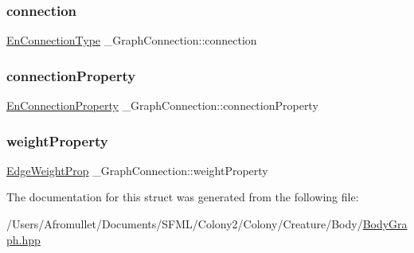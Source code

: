 \subsubsection{\texorpdfstring{connection}{connection}}
{\footnotesize\ttfamily \mbox{\hyperlink{_body_graph_8hpp_a1a9cb52373e2881d50e8971ff4a37803}{En\+Connection\+Type}} \+\_\+\+Graph\+Connection\+::connection}

\mbox{\label{struct___graph_connection_ab4f55b760335b06eb893f9abded06939}} 
\subsubsection{\texorpdfstring{connection\+Property}{connectionProperty}}
{\footnotesize\ttfamily \mbox{\hyperlink{_body_graph_8hpp_aaf075ead75a7b8171312447a8e13aab8}{En\+Connection\+Property}} \+\_\+\+Graph\+Connection\+::connection\+Property}

\mbox{\label{struct___graph_connection_a243a1a161c39bafe16a580f2fca162d1}} 
\subsubsection{\texorpdfstring{weight\+Property}{weightProperty}}
{\footnotesize\ttfamily \mbox{\hyperlink{_body_graph_8hpp_aca4f327513ae6b3eeddfb5d9ccff4eb7}{Edge\+Weight\+Prop}} \+\_\+\+Graph\+Connection\+::weight\+Property}



The documentation for this struct was generated from the following file\+:\begin{DoxyCompactItemize}
\item 
/\+Users/\+Afromullet/\+Documents/\+S\+F\+M\+L/\+Colony2/\+Colony/\+Creature/\+Body/\mbox{\hyperlink{_body_graph_8hpp}{Body\+Graph.\+hpp}}\end{DoxyCompactItemize}
